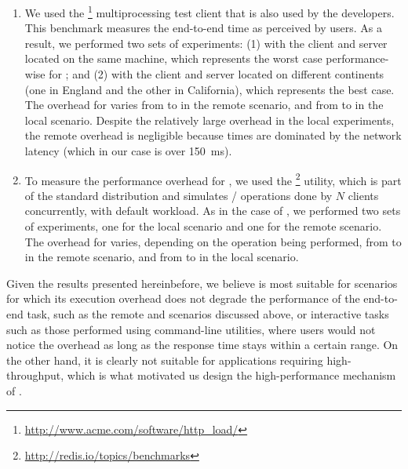\begin{enumerate}
\item[\lighttpd] We used the
  \httpload\footnote{\url{http://www.acme.com/software/http_load/}}
  multiprocessing test client that is also used by the \lighttpd developers.
  This benchmark measures the end-to-end time as perceived by users. As a
  result, we performed two sets of experiments: (1) with the client and server
  located on the same machine, which represents the worst case performance-wise
  for \mx; and (2) with the client and server located on different continents
  (one in England and the other in California), which represents the best case.
  The overhead for \lighttpd varies from \minLighttpdRemote to
  \maxLighttpdRemote in the remote scenario, and from \minLighttpdOver to
  \maxLighttpdOver in the local scenario.  Despite the relatively large
  overhead in the local experiments, the remote overhead is negligible because
  times are dominated by the network latency (which in our case is over
  \SI{150}{\milli\second}).

\item[\redis] To measure the performance overhead for \redis, we used the
  \redisbenchmark\footnote{\url{http://redis.io/topics/benchmarks}} utility,
  which is part of the standard \redis distribution and simulates
  / operations done by $N$ clients concurrently, with
  default workload. As in the case of \lighttpd, we performed two sets of
  experiments, one for the local scenario and one for the remote scenario. The
  overhead for \redis varies, depending on the operation being performed, from
  \minRedisRemote to \maxRedisRemote in the remote scenario, and from
  \minRedisOver to \maxRedisOver in the local scenario. 

\end{enumerate}

Given the results presented hereinbefore, we believe \mx is most suitable for
scenarios for which its execution overhead does not degrade the performance of
the end-to-end task, such as the remote \redis and \lighttpd scenarios
discussed above, or interactive tasks such as those performed using
command-line utilities, where users would not notice the overhead as long as
the response time stays within a certain range. On the other hand, it is
clearly not suitable for applications requiring high-throughput, which is what
motivated us design the high-performance mechanism of \varan.


